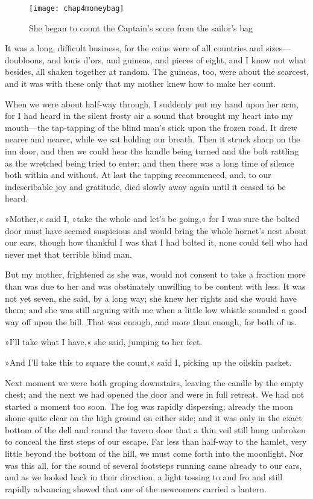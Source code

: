 \begin{figure}[p]
\centering
\texttt{[image: chap4moneybag]}
\caption[She began to count the Captain's score]{She began to count the Captain's score from the sailor's bag}
\end{figure}

It was a long, difficult business, for the coins were of all countries and sizes—doubloons, and louis d'ors, and guineas, and pieces of eight, and I know not what besides, all shaken together at random. The guineas, too, were about the scarcest, and it was with these only that my mother knew how to make her count.

When we were about half-way through, I suddenly put my hand upon her arm, for I had heard in the silent frosty air a sound that brought my heart into my mouth—the tap-tapping of the blind man's stick upon the frozen road. It drew nearer and nearer, while we sat holding our breath. Then it struck sharp on the inn door, and then we could hear the handle being turned and the bolt rattling as the wretched being tried to enter; and then there was a long time of silence both within and without. At last the tapping recommenced, and, to our indescribable joy and gratitude, died slowly away again until it ceased to be heard.

»Mother,« said I, »take the whole and let's be going,« for I was sure the bolted door must have seemed suspicious and would bring the whole hornet's nest about our ears, though how thankful I was that I had bolted it, none could tell who had never met that terrible blind man.

But my mother, frightened as she was, would not consent to take a fraction more than was due to her and was obstinately unwilling to be content with less. It was not yet seven, she said, by a long way; she knew her rights and she would have them; and she was still arguing with me when a little low whistle sounded a good way off upon the hill. That was enough, and more than enough, for both of us.

»I'll take what I have,« she said, jumping to her feet.

»And I'll take this to square the count,« said I, picking up the oilskin packet.

Next moment we were both groping downstairs, leaving the candle by the empty chest; and the next we had opened the door and were in full retreat. We had not started a moment too soon. The fog was rapidly dispersing; already the moon shone quite clear on the high ground on either side; and it was only in the exact bottom of the dell and round the tavern door that a thin veil still hung unbroken to conceal the first steps of our escape. Far less than half-way to the hamlet, very little beyond the bottom of the hill, we must come forth into the moonlight. Nor was this all, for the sound of several footsteps running came already to our ears, and as we looked back in their direction, a light tossing to and fro and still rapidly advancing showed that one of the newcomers carried a lantern.

